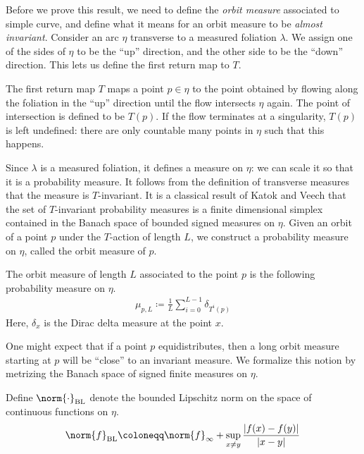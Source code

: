 \documentclass[12pt, reqno]{amsart}
\begin{document}
Before we prove this result, we need to define the \emph{orbit measure} associated to simple curve, and define what it means for an orbit measure to be \emph{almost invariant}.
Consider an arc $\eta$ transverse to a measured foliation $\lambda$.
We assign one of the sides of $\eta$ to be the ``up'' direction, and the other side to be the ``down'' direction.
This lets us define the first return map to $T$.
\begin{definition}
  The first return map $T$ maps a point $p \in \eta$ to the point obtained by flowing along the foliation in the ``up'' direction until the flow intersects $\eta$ again.
  The point of intersection is defined to be $T(p)$.
  If the flow terminates at a singularity, $T(p)$ is left undefined: there are only countable many points in $\eta$ such that this happens.
\end{definition}
Since $\lambda$ is a measured foliation, it defines a measure on $\eta$: we can scale it so that it is a probability measure.
It follows from the definition of transverse measures that the measure is $T$-invariant.
It is a classical result of Katok \cite{zbMATH03467479}  and Veech \cite{Veech1978} that the set of $T$-invariant probability measures is a finite dimensional simplex contained in the Banach space of bounded signed measures on $\eta$.
Given an orbit of a point $p$ under the $T$-action of length $L$, we construct a probability measure on $\eta$, called the orbit measure of $p$.
\begin{definition}
  The orbit measure of length $L$ associated to the point $p$ is the following probability measure on $\eta$.
  \begin{align*}
    \mu_{p, L} \coloneqq \frac{1}{L} \sum_{i=0}^{L-1} \delta_{T^i(p)}
  \end{align*}
  Here, $\delta_{x}$ is the Dirac delta measure at the point $x$.
\end{definition}
One might expect that if a point $p$ equidistributes, then a long orbit measure starting at $p$ will be ``close'' to an invariant measure.
We formalize this notion by metrizing the Banach space of signed finite measures on $\eta$.
\begin{definition}
  Define $\norm{\cdot}_{\mathrm{BL}}$ denote the bounded Lipschitz norm on the space of continuous functions on $\eta$.
  \begin{align*}
    \norm{f}_{\mathrm{BL}} \coloneqq \norm{f}_{\infty} + \sup_{x \neq y} \frac{\left| f(x) - f(y) \right|}{\left| x - y \right|}
  \end{align*}
\end{definition}
\end{document}
